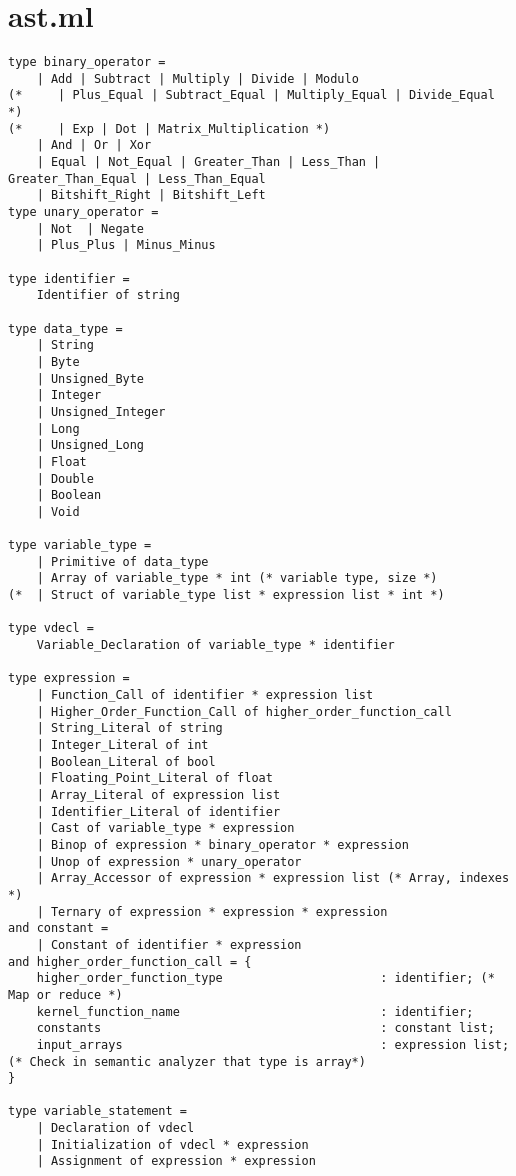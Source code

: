 \section{ast.ml}
\begin{verbatim}
type binary_operator =
    | Add | Subtract | Multiply | Divide | Modulo
(*     | Plus_Equal | Subtract_Equal | Multiply_Equal | Divide_Equal  *)
(*     | Exp | Dot | Matrix_Multiplication *)
    | And | Or | Xor
    | Equal | Not_Equal | Greater_Than | Less_Than | Greater_Than_Equal | Less_Than_Equal
    | Bitshift_Right | Bitshift_Left 
type unary_operator = 
    | Not  | Negate
    | Plus_Plus | Minus_Minus

type identifier = 
    Identifier of string

type data_type = 
    | String
    | Byte
    | Unsigned_Byte
    | Integer
    | Unsigned_Integer
    | Long
    | Unsigned_Long
    | Float
    | Double
    | Boolean
    | Void

type variable_type = 
    | Primitive of data_type
    | Array of variable_type * int (* variable type, size *)
(*  | Struct of variable_type list * expression list * int *)

type vdecl = 
    Variable_Declaration of variable_type * identifier

type expression =
    | Function_Call of identifier * expression list
    | Higher_Order_Function_Call of higher_order_function_call
    | String_Literal of string
    | Integer_Literal of int
    | Boolean_Literal of bool
    | Floating_Point_Literal of float
    | Array_Literal of expression list
    | Identifier_Literal of identifier 
    | Cast of variable_type * expression
    | Binop of expression * binary_operator * expression
    | Unop of expression * unary_operator
    | Array_Accessor of expression * expression list (* Array, indexes *)
    | Ternary of expression * expression * expression
and constant = 
    | Constant of identifier * expression
and higher_order_function_call = {
    higher_order_function_type                      : identifier; (* Map or reduce *)
    kernel_function_name                            : identifier;
    constants                                       : constant list;
    input_arrays                                    : expression list; (* Check in semantic analyzer that type is array*)
}

type variable_statement = 
    | Declaration of vdecl
    | Initialization of vdecl * expression
    | Assignment of expression * expression


\end{verbatim}
